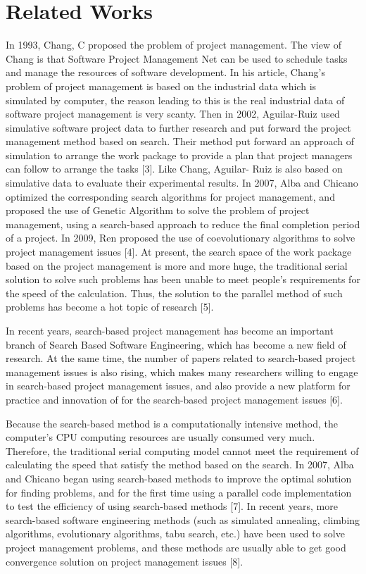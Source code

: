 
\section{Related Works}
%
In 1993, Chang, C proposed the problem of project management. The view of 
Chang is that Software Project Management Net can be used to schedule tasks 
and manage the resources of software development. In his article, Chang's 
problem of project management is based on the industrial data which is 
simulated by computer, the reason leading to this is the real industrial data 
of software project management is very scanty. Then in 2002, Aguilar-Ruiz 
used simulative software project data to further research and put forward the 
project management method based on search. Their method put forward an 
approach of simulation to arrange the work package to provide a plan that 
project managers can follow to arrange the tasks [3]. Like Chang, Aguilar-
Ruiz is also based on simulative data to evaluate their experimental results. 
In 2007, Alba and Chicano optimized the corresponding search algorithms for 
project management, and proposed the use of Genetic Algorithm to solve the 
problem of project management, using a search-based approach to reduce the 
final completion period of a project. In 2009, Ren proposed the use of 
coevolutionary algorithms to solve project management issues [4]. At present, 
the search space of the work package based on the project management is more 
and more huge, the traditional serial solution to solve such problems has 
been unable to meet people's requirements for the speed of the calculation. 
Thus, the solution to the parallel method of such problems has become a hot 
topic of research [5].


In recent years, search-based project management has become an important 
branch of Search Based Software Engineering, which has become a new field of 
research. At the same time, the number of papers related to search-based 
project management issues is also rising, which makes many researchers 
willing to engage in search-based project management issues, and also provide 
a new platform for practice and innovation of for the search-based project 
management issues [6].


Because the search-based method is a computationally intensive method, the 
computer's CPU computing resources are usually consumed very much. Therefore, 
the traditional serial computing model cannot meet the requirement of 
calculating the speed that satisfy the method based on the search. In 2007, 
Alba and Chicano began using search-based methods to improve the optimal 
solution for finding problems, and for the first time using a parallel code 
implementation to test the efficiency of using search-based methods [7]. In 
recent years, more search-based software engineering methods (such as 
simulated annealing, climbing algorithms, evolutionary algorithms, tabu 
search, etc.) have been used to solve project management problems, and these 
methods are usually able to get good convergence solution on project 
management issues [8].


